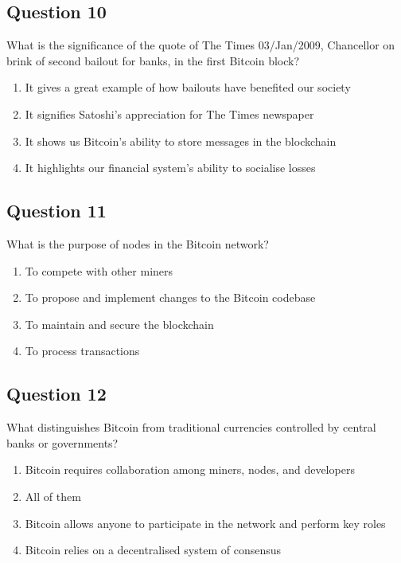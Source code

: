 \documentclass[12pt,a4paper]{article}
\begin{document}
\bigskip


\subsection*{Question 10}
What is the significance of the quote of The Times 03/Jan/2009, Chancellor on brink of second bailout for banks, in the first Bitcoin block?

\begin{enumerate}[label=\Alph*., leftmargin=*]
\item It gives a great example of how bailouts have benefited our society
\item It signifies Satoshi’s appreciation for The Times newspaper
\item It shows us Bitcoin's ability to store messages in the blockchain
\item It highlights our financial system's ability to socialise losses
\end{enumerate}

\bigskip


\subsection*{Question 11}
What is the purpose of nodes in the Bitcoin network?

\begin{enumerate}[label=\Alph*., leftmargin=*]
\item To compete with other miners
\item To propose and implement changes to the Bitcoin codebase
\item To maintain and secure the blockchain
\item To process transactions
\end{enumerate}

\bigskip


\subsection*{Question 12}
What distinguishes Bitcoin from traditional currencies controlled by central banks or governments?

\begin{enumerate}[label=\Alph*., leftmargin=*]
\item Bitcoin requires collaboration among miners, nodes, and developers
\item All of them
\item Bitcoin allows anyone to participate in the network and perform key roles
\item Bitcoin relies on a decentralised system of consensus
\end{enumerate}
\end{document}

